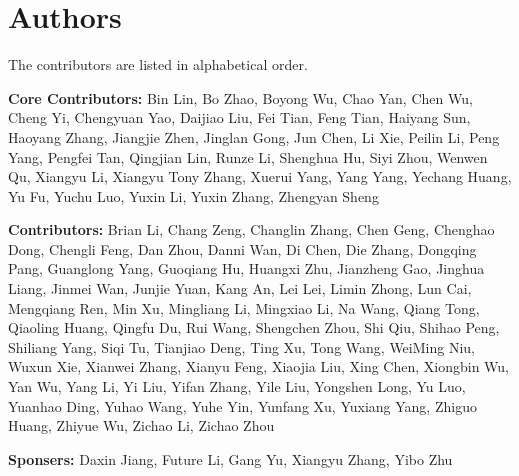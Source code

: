 \section*{Authors}
The contributors are listed in alphabetical order.

\vspace{0.5em}
\textbf{Core Contributors:}
Bin Lin,
Bo Zhao,
Boyong Wu,
Chao Yan,
Chen Wu,
Cheng Yi,
Chengyuan Yao,   %
Daijiao Liu,
Fei Tian,
Feng Tian,   %
Haiyang Sun,
Haoyang Zhang,
Jiangjie Zhen,   %
Jinglan Gong,
Jun Chen,
Li Xie,   %
Peilin Li,   %
Peng Yang,
Pengfei Tan,
Qingjian Lin,
Runze Li,
Shenghua Hu,   %
Siyi Zhou,
Wenwen Qu,   %
Xiangyu Li,   %
Xiangyu Tony Zhang,
Xuerui Yang,   %
Yang Yang,   %
Yechang Huang,
Yu Fu,
Yuchu Luo,   %
Yuxin Li,
Yuxin Zhang,
Zhengyan Sheng

\vspace{0.5em}
\textbf{Contributors:}
Brian Li,
Chang Zeng,
Changlin Zhang,
Chen Geng,
Chenghao Dong,
Chengli Feng,
Dan Zhou,
Danni Wan,
Di Chen,
Die Zhang,
Dongqing Pang,
Guanglong Yang,
Guoqiang Hu,
Huangxi Zhu,
Jianzheng Gao,
Jinghua Liang,
Jinmei Wan,
Junjie Yuan,
Kang An,
Lei Lei,
Limin Zhong,
Lun Cai,
Mengqiang Ren,
Min Xu,
Mingliang Li,
Mingxiao Li,
Na Wang,
Qiang Tong,
Qiaoling Huang,
Qingfu Du,
Rui Wang,
Shengchen Zhou,
Shi Qiu,
Shihao Peng,
Shiliang Yang,
Siqi Tu,
Tianjiao Deng,
Ting Xu,
Tong Wang,
WeiMing Niu,
Wuxun Xie,
Xianwei Zhang,
Xianyu Feng,
Xiaojia Liu,
Xing Chen,
Xiongbin Wu,
Yan Wu,
Yang Li,
Yi Liu,
Yifan Zhang,
Yile Liu,
Yongshen Long,
Yu Luo,
Yuanhao Ding,
Yuhao Wang,
Yuhe Yin,
Yunfang Xu,
Yuxiang Yang,
Zhiguo Huang,
Zhiyue Wu,
Zichao Li,
Zichao Zhou

\vspace{0.5em}
\textbf{Sponsers:}
Daxin Jiang,
Future Li,
Gang Yu,
Xiangyu Zhang,
Yibo Zhu







